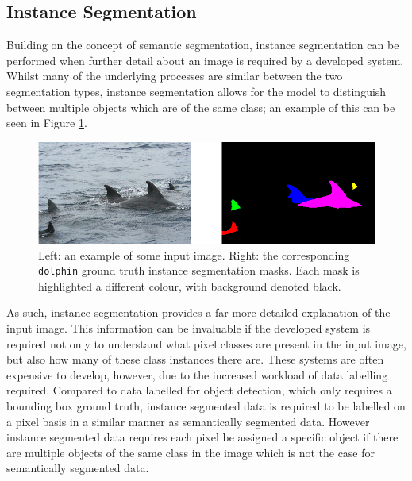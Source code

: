 \subsection{Instance Segmentation}\label{ch:Background,sec:instanceSegmentation}

Building on the concept of semantic segmentation, instance segmentation can be performed when further detail about an image is required by a developed system. Whilst many of the underlying processes are similar between the two segmentation types, instance segmentation allows for the model to distinguish between multiple objects which are of the same class; an example of this can be seen in Figure \ref{fig:masks-example}.

\begin{figure}
	\begin{center}
		\includegraphics[scale=0.5]{Chapter2/figs/masks-example-updated-colours.png}
	\end{center}
	\caption[Left: an example of some input image. Right: the corresponding \texttt{dolphin} ground truth instance segmentation masks.]{Left: an example of some input image. Right: the corresponding \texttt{dolphin} ground truth instance segmentation masks. Each mask is highlighted a different colour, with background denoted black.}
	\label{fig:masks-example}
\end{figure}

As such, instance segmentation provides a far more detailed explanation of the input image. This information can be invaluable if the developed system is required not only to understand what pixel classes are present in the input image, but also how many of these class instances there are. These systems are often expensive to develop, however, due to the increased workload of data labelling required. Compared to data labelled for object detection, which only requires a bounding box ground truth, instance segmented data is required to be labelled on a pixel basis in a similar manner as semantically segmented data. However instance segmented data requires each pixel be assigned a specific object if there are multiple objects of the same class in the image which is not the case for semantically segmented data.

